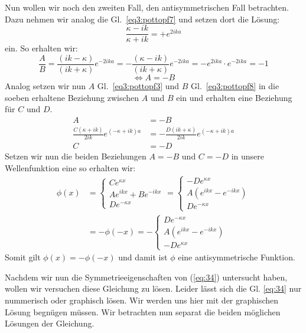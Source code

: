 Nun wollen wir noch den zweiten Fall, den antisymmetrischen Fall betrachten.
Dazu nehmen wir analog die Gl.~\eqref{eq3:pottopf7} und setzen dort die Lösung:
\[ \frac{\kappa-ik}{\kappa+ik}= +e^{2ika} \]
ein. So erhalten wir:
\begin{equation*}
  \frac A B =\frac{(ik-\kappa)}{(ik+\kappa)}e^{-2ika}
      =-\frac{(\kappa-ik)}{(ik+\kappa)}e^{-2ika}
      = -e^{2ika}\cdot e^{-2ika}
      =-1
\end{equation*}
\[ \Leftrightarrow A = -B \] Analog setzen wir nun $A$ Gl.~\eqref{eq3:pottopf3}
und $B$ Gl.~\eqref{eq3:pottopf8} in die soeben erhaltene Beziehung zwischen $A$
und $B$ ein und erhalten eine Beziehung für $C$ und $D$.
\begin{align*}
  A &= -B \\
  \frac{C(\kappa+ik)}{2ik}e^{(-\kappa +ik)a} 
  &=-\frac{D(ik+\kappa)}{2ik}e^{(-\kappa+ik)a}\\
  C &= -D
\end{align*}
Setzen wir nun die beiden Beziehungen $A=-B$ und $C=-D$ in unsere Wellenfunktion
eine so erhalten wir:
\begin{align*}
  \phi(x) &= \begin{cases}
  Ce^{\kappa x}\\
  Ae^{ikx}+Be^{-ikx}\\
  De^{-\kappa x}
\end{cases}
= \begin{cases}
  -De^{\kappa x}\\
  A\left(e^{ikx}-e^{-ikx}\right)\\
  De^{-\kappa x}
\end{cases}\\  
&=-\phi(-x) = -\begin{cases} 
 De^{-\kappa x}\\
  A\left(e^{ikx}-e^{-ikx}\right)\\
  -De^{\kappa x} 
\end{cases}
\end{align*}
Somit gilt $\phi(x)=-\phi(-x)$ und damit ist $\phi$ eine antisymmetrische
Funktion.

Nachdem wir nun die Symmetrieeigenschaften von (\ref{eq:34}) untersucht haben,
wollen wir versuchen diese Gleichung zu lösen. Leider lässt sich die Gl.
\eqref{eq:34} nur nummerisch oder graphisch lösen. Wir werden uns hier mit der
graphischen Lösung begnügen müssen. Wir betrachten nun separat die beiden
möglichen Lösungen der Gleichung.

